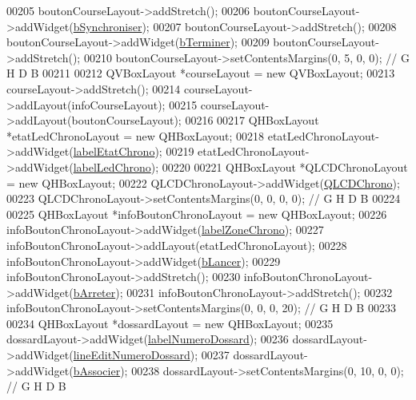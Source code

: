 \begin{DoxyCode}
00205     boutonCourseLayout->addStretch();
00206     boutonCourseLayout->addWidget(\hyperlink{class_i_h_m_chrono_cross_aaef501bd1190a5ec06a214d3265b8c0b}{bSynchroniser});
00207     boutonCourseLayout->addStretch();
00208     boutonCourseLayout->addWidget(\hyperlink{class_i_h_m_chrono_cross_a63721ec2d7d51b11b164b4502ace8262}{bTerminer});
00209     boutonCourseLayout->addStretch();
00210     boutonCourseLayout->setContentsMargins(0, 5, 0, 0); \textcolor{comment}{// G H D B}
00211 
00212     QVBoxLayout *courseLayout = \textcolor{keyword}{new} QVBoxLayout;
00213     courseLayout->addStretch();
00214     courseLayout->addLayout(infoCourseLayout);
00215     courseLayout->addLayout(boutonCourseLayout);
00216 
00217     QHBoxLayout *etatLedChronoLayout = \textcolor{keyword}{new} QHBoxLayout;
00218     etatLedChronoLayout->addWidget(\hyperlink{class_i_h_m_chrono_cross_ad247dfd005cb835c90aca67b1384578b}{labelEtatChrono});
00219     etatLedChronoLayout->addWidget(\hyperlink{class_i_h_m_chrono_cross_ad43bab2d9a06fe2fb198c56d8b9faab2}{labelLedChrono});
00220 
00221     QHBoxLayout *QLCDChronoLayout = \textcolor{keyword}{new} QHBoxLayout;
00222     QLCDChronoLayout->addWidget(\hyperlink{class_i_h_m_chrono_cross_a6169c1483faab14d1f619d1d838c198e}{QLCDChrono});
00223     QLCDChronoLayout->setContentsMargins(0, 0, 0, 0); \textcolor{comment}{// G H D B}
00224 
00225     QHBoxLayout *infoBoutonChronoLayout = \textcolor{keyword}{new} QHBoxLayout;
00226     infoBoutonChronoLayout->addWidget(\hyperlink{class_i_h_m_chrono_cross_ad28922f5316673a1e181747879ef6855}{labelZoneChrono});
00227     infoBoutonChronoLayout->addLayout(etatLedChronoLayout);
00228     infoBoutonChronoLayout->addWidget(\hyperlink{class_i_h_m_chrono_cross_a1b0a7c5e58d6a9f873cdc912d67b8de9}{bLancer});
00229     infoBoutonChronoLayout->addStretch();
00230     infoBoutonChronoLayout->addWidget(\hyperlink{class_i_h_m_chrono_cross_a75ce4fcdab11095834fe3f9e931f8964}{bArreter});
00231     infoBoutonChronoLayout->addStretch();
00232     infoBoutonChronoLayout->setContentsMargins(0, 0, 0, 20); \textcolor{comment}{// G H D B}
00233 
00234     QHBoxLayout *dossardLayout = \textcolor{keyword}{new} QHBoxLayout;
00235     dossardLayout->addWidget(\hyperlink{class_i_h_m_chrono_cross_a73afea901ae4b6eb4c0d136818ed1fa6}{labelNumeroDossard});
00236     dossardLayout->addWidget(\hyperlink{class_i_h_m_chrono_cross_ad2e156ff9412644debf8da7a3ec1566d}{lineEditNumeroDossard});
00237     dossardLayout->addWidget(\hyperlink{class_i_h_m_chrono_cross_aec2458a0c2ff0d2c37fa409fb8e99ce7}{bAssocier});
00238     dossardLayout->setContentsMargins(0, 10, 0, 0); \textcolor{comment}{// G H D B}

\end{DoxyCode}
